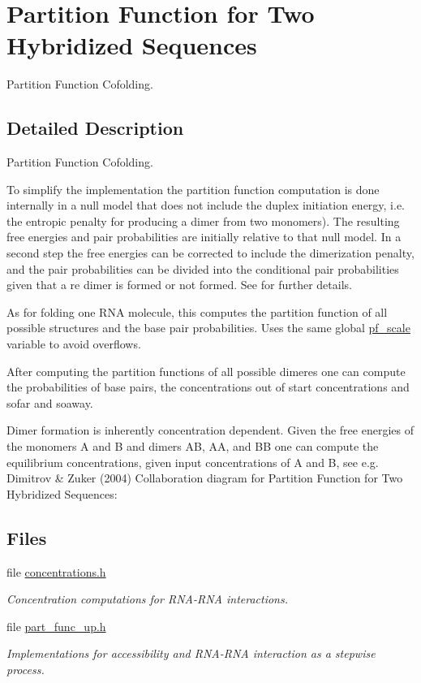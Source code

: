 \hypertarget{group__pf__cofold}{}\section{Partition Function for Two Hybridized Sequences}
\label{group__pf__cofold}


Partition Function Cofolding.  




\subsection{Detailed Description}
Partition Function Cofolding. 

To simplify the implementation the partition function computation is done internally in a null model that does not include the duplex initiation energy, i.\+e. the entropic penalty for producing a dimer from two monomers). The resulting free energies and pair probabilities are initially relative to that null model. In a second step the free energies can be corrected to include the dimerization penalty, and the pair probabilities can be divided into the conditional pair probabilities given that a re dimer is formed or not formed. See \cite{bernhart:2006} for further details.

As for folding one R\+NA molecule, this computes the partition function of all possible structures and the base pair probabilities. Uses the same global \mbox{\hyperlink{group__model__details_gad3b22044065acc6dee0af68931b52cfd}{pf\+\_\+scale}} variable to avoid overflows.

After computing the partition functions of all possible dimeres one can compute the probabilities of base pairs, the concentrations out of start concentrations and sofar and soaway.

Dimer formation is inherently concentration dependent. Given the free energies of the monomers A and B and dimers AB, AA, and BB one can compute the equilibrium concentrations, given input concentrations of A and B, see e.\+g. Dimitrov \& Zuker (2004) Collaboration diagram for Partition Function for Two Hybridized Sequences\+:
\subsection*{Files}
\begin{DoxyCompactItemize}
\item 
file \mbox{\hyperlink{concentrations_8h}{concentrations.\+h}}
\begin{DoxyCompactList}\small\item\em Concentration computations for R\+N\+A-\/\+R\+NA interactions. \end{DoxyCompactList}\item 
file \mbox{\hyperlink{part__func__up_8h}{part\+\_\+func\+\_\+up.\+h}}
\begin{DoxyCompactList}\small\item\em Implementations for accessibility and R\+N\+A-\/\+R\+NA interaction as a stepwise process. \end{DoxyCompactList}\end{DoxyCompactItemize}
